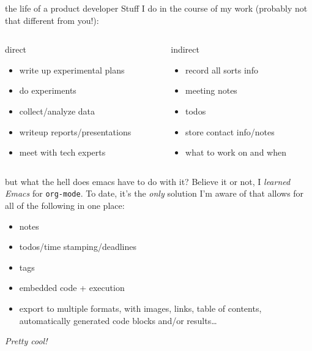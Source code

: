 \documentclass[aspectratio=169,presentation,bigger,fleqn,t]{beamer}
\begin{document}
\begin{frame}[label={sec:orgheadline2}]{the life of a product developer}
Stuff I do in the course of my work (probably not that different from you!):

\begin{columns}
\begin{column}{0.5\columnwidth}
\begin{block}{direct}
\begin{itemize}
\item write up experimental plans
\item do experiments
\item collect/analyze data
\item writeup reports/presentations
\item meet with tech experts
\end{itemize}
\end{block}
\end{column}

\begin{column}{0.5\columnwidth}
\begin{block}{indirect}
\begin{itemize}
\item record all sorts info
\item meeting notes
\item todos
\item store contact info/notes
\item what to work on and when
\end{itemize}
\end{block}
\end{column}
\end{columns}
\end{frame}

\begin{frame}[fragile,label={sec:orgheadline3}]{but what the hell does emacs have to do with it?}
 Believe it or not, I \emph{learned Emacs} for \texttt{org-mode}. To date, it's the \emph{only} solution I'm
aware of that allows for all of the following in one place:
\begin{itemize}
\item notes
\item todos/time stamping/deadlines
\item tags
\item embedded code + execution
\item export to multiple formats, with images, links, table of contents, automatically
generated code blocks and/or results\ldots{}
\end{itemize}

\pause

\emph{Pretty cool!}
\end{frame}
\end{document}
